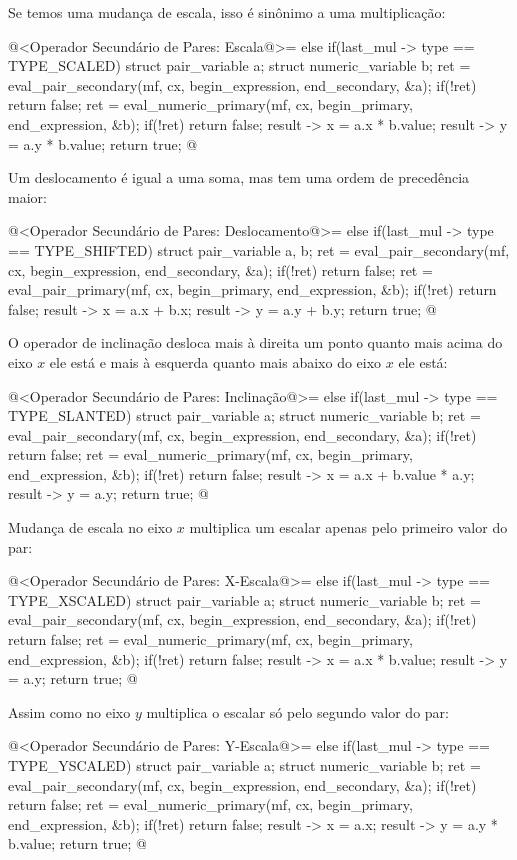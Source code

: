 Se temos uma mudança de escala, isso é sinônimo a uma multiplicação:

\iniciocodigo
@<Operador Secundário de Pares: Escala@>=
else if(last_mul -> type == TYPE_SCALED){
  struct pair_variable a;
  struct numeric_variable b;
  ret = eval_pair_secondary(mf, cx, begin_expression, end_secondary, &a);
  if(!ret)
    return false;
  ret = eval_numeric_primary(mf, cx, begin_primary, end_expression, &b);
  if(!ret)
    return false;
  result -> x = a.x * b.value;
  result -> y = a.y * b.value;
  return true;
}
@
\fimcodigo

Um deslocamento é igual a uma soma, mas tem uma ordem de precedência
maior:

\iniciocodigo
@<Operador Secundário de Pares: Deslocamento@>=
else if(last_mul -> type == TYPE_SHIFTED){
  struct pair_variable a, b;
  ret = eval_pair_secondary(mf, cx, begin_expression, end_secondary, &a);
  if(!ret)
    return false;
  ret = eval_pair_primary(mf, cx, begin_primary, end_expression, &b);
  if(!ret)
    return false;
  result -> x = a.x + b.x;
  result -> y = a.y + b.y;
  return true;
}
@
\fimcodigo

O operador de inclinação desloca mais à direita um ponto quanto mais
acima do eixo $x$ ele está e mais à esquerda quanto mais abaixo do
eixo $x$ ele está:

\iniciocodigo
@<Operador Secundário de Pares: Inclinação@>=
else if(last_mul -> type == TYPE_SLANTED){
  struct pair_variable a;
  struct numeric_variable b;
  ret = eval_pair_secondary(mf, cx, begin_expression, end_secondary, &a);
  if(!ret)
    return false;
  ret = eval_numeric_primary(mf, cx, begin_primary, end_expression, &b);
  if(!ret)
    return false;
  result -> x = a.x + b.value * a.y;
  result -> y = a.y;
  return true;
}
@
\fimcodigo

Mudança de escala no eixo $x$ multiplica um escalar apenas pelo
primeiro valor do par:

\iniciocodigo
@<Operador Secundário de Pares: X-Escala@>=
else if(last_mul -> type == TYPE_XSCALED){
  struct pair_variable a;
  struct numeric_variable b;
  ret = eval_pair_secondary(mf, cx, begin_expression, end_secondary, &a);
  if(!ret)
    return false;
  ret = eval_numeric_primary(mf, cx, begin_primary, end_expression, &b);
  if(!ret)
    return false;
  result -> x = a.x * b.value;
  result -> y = a.y;
  return true;
}
@
\fimcodigo

Assim como no eixo $y$ multiplica o escalar só pelo segundo valor do
par:

\iniciocodigo
@<Operador Secundário de Pares: Y-Escala@>=
else if(last_mul -> type == TYPE_YSCALED){
  struct pair_variable a;
  struct numeric_variable b;
  ret = eval_pair_secondary(mf, cx, begin_expression, end_secondary, &a);
  if(!ret)
    return false;
  ret = eval_numeric_primary(mf, cx, begin_primary, end_expression, &b);
  if(!ret)
    return false;
  result -> x = a.x;
  result -> y = a.y * b.value;
  return true;
}
@
\fimcodigo

